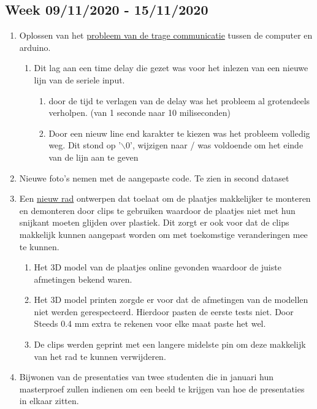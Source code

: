 \documentclass{scrartcl}
\begin{document}
\subsection{Week 09/11/2020 - 15/11/2020}

\begin{enumerate}[1]
\item Oplossen van het \href{../../Code/Problems/arduino_loop_time.tex}{probleem van de trage communicatie} tussen de computer en arduino. 
	\begin{enumerate}[a]
	\item Dit lag aan een time delay die gezet was voor het inlezen van een nieuwe lijn van de seriele input. 
		\begin{enumerate}[1]
		\item door de tijd te verlagen van de delay was het probleem al grotendeels verholpen. (van 1 seconde naar 10 miliseconden)
		\item Door een nieuw line end karakter te kiezen was het probleem volledig weg. Dit stond op '$\backslash$0', wijzigen naar / was voldoende om het einde van de lijn aan te geven
		\end{enumerate}
	\end{enumerate}
\item Nieuwe foto's nemen met de aangepaste code. Te zien in second dataset
\item Een \href{../../Camera_setup/Tool_Holder/Wheel_Holder/Second_Wheel_Holder.tex}{nieuw rad} ontwerpen dat toelaat om de plaatjes makkelijker te monteren en demonteren door clips te gebruiken waardoor de plaatjes niet met hun snijkant moeten glijden over plastiek. Dit zorgt er ook voor dat de clips makkelijk kunnen aangepast worden om met toekomstige veranderingen mee te kunnen.
	\begin{enumerate}[a]
	\item Het 3D model van de plaatjes online gevonden waardoor de juiste afmetingen bekend waren.
	\item Het 3D model printen zorgde er voor dat de afmetingen van de modellen niet werden gerespecteerd. Hierdoor pasten de eerste tests niet. Door Steeds 0.4 mm extra te rekenen voor elke maat paste het wel. 
	\item De clips werden geprint met een langere midelste pin om deze makkelijk van het rad te kunnen verwijderen. 
	\end{enumerate}
\item Bijwonen van de presentaties van twee studenten die in januari hun masterproef zullen indienen om een beeld te krijgen van hoe de presentaties in elkaar zitten.

\end{enumerate}
\end{document}
